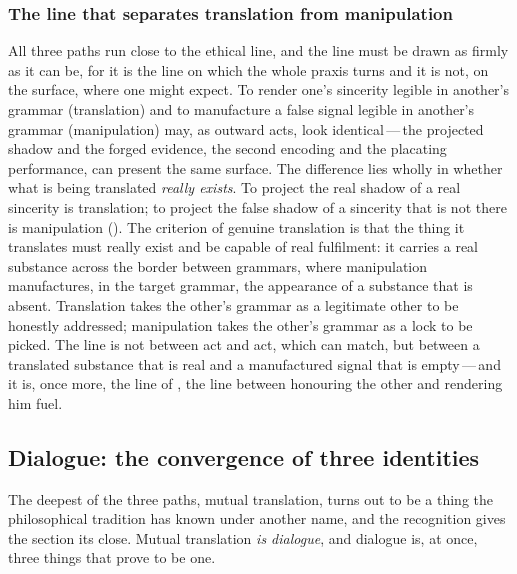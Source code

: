 \subsubsection{The line that separates translation from manipulation}
\label{p13:sub:trans-line}

All three paths run close to the ethical line, and the line must be drawn as firmly as it can be, for it is the line on which the whole praxis turns and it is not, on the surface, where one might expect. To render one's sincerity legible in another's grammar (translation) and to manufacture a false signal legible in another's grammar (manipulation) may, as outward acts, look identical\,---\,the projected shadow and the forged evidence, the second encoding and the placating performance, can present the same surface. The difference lies wholly in whether what is being translated \emph{really exists}. To project the real shadow of a real sincerity is translation; to project the false shadow of a sincerity that is not there is manipulation (). The criterion of genuine translation is that the thing it translates must really exist and be capable of real fulfilment: it carries a real substance across the border between grammars, where manipulation manufactures, in the target grammar, the appearance of a substance that is absent. Translation takes the other's grammar as a legitimate other to be honestly addressed; manipulation takes the other's grammar as a lock to be picked. The line is not between act and act, which can match, but between a translated substance that is real and a manufactured signal that is empty\,---\,and it is, once more, the line of , the line between honouring the other and rendering him fuel.

\subsection{Dialogue: the convergence of three identities}
\label{p13:sub:trans-dialogue}

The deepest of the three paths, mutual translation, turns out to be a thing the philosophical tradition has known under another name, and the recognition gives the section its close. Mutual translation \emph{is dialogue}, and dialogue is, at once, three things that prove to be one.

